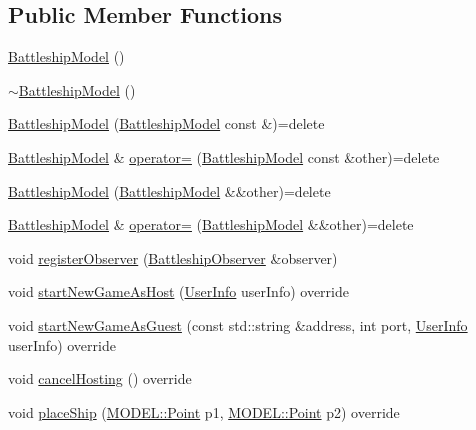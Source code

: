 \subsection*{Public Member Functions}
\begin{DoxyCompactItemize}
\item 
\hyperlink{classMODEL_1_1BattleshipModel_a8a7bef3348e68cf0267e79b445b94568}{Battleship\+Model} ()
\item 
\hyperlink{classMODEL_1_1BattleshipModel_aa5e22efe2dea484de9864a5a76b1c9f4}{$\sim$\+Battleship\+Model} ()
\item 
\hyperlink{classMODEL_1_1BattleshipModel_a7b959ebae2e8f6a5cf5a58aad6ee1676}{Battleship\+Model} (\hyperlink{classMODEL_1_1BattleshipModel}{Battleship\+Model} const \&)=delete
\item 
\hyperlink{classMODEL_1_1BattleshipModel}{Battleship\+Model} \& \hyperlink{classMODEL_1_1BattleshipModel_a6ba44e1437139bfe18033f0093e650db}{operator=} (\hyperlink{classMODEL_1_1BattleshipModel}{Battleship\+Model} const \&other)=delete
\item 
\hyperlink{classMODEL_1_1BattleshipModel_a6320be6c1f48b3f910929ac0e4b8fa1e}{Battleship\+Model} (\hyperlink{classMODEL_1_1BattleshipModel}{Battleship\+Model} \&\&other)=delete
\item 
\hyperlink{classMODEL_1_1BattleshipModel}{Battleship\+Model} \& \hyperlink{classMODEL_1_1BattleshipModel_a959c97c06c66558cf04ad4d91c5b5578}{operator=} (\hyperlink{classMODEL_1_1BattleshipModel}{Battleship\+Model} \&\&other)=delete
\item 
void \hyperlink{classMODEL_1_1BattleshipModel_a1afa557183362f561ae105fa141941ea}{register\+Observer} (\hyperlink{classBattleshipObserver}{Battleship\+Observer} \&observer)
\item 
void \hyperlink{classMODEL_1_1BattleshipModel_a655da28525f6ac4d2d15da6808c538b9}{start\+New\+Game\+As\+Host} (\hyperlink{classUserInfo}{User\+Info} user\+Info) override
\item 
void \hyperlink{classMODEL_1_1BattleshipModel_a076ef235e6ff9708c2bc0c2a4dcc141b}{start\+New\+Game\+As\+Guest} (const std\+::string \&address, int port, \hyperlink{classUserInfo}{User\+Info} user\+Info) override
\item 
void \hyperlink{classMODEL_1_1BattleshipModel_aa7cd87fbe771e195626f19960095bded}{cancel\+Hosting} () override
\item 
void \hyperlink{classMODEL_1_1BattleshipModel_a6de4c3b25683e4774fc9b524aa8c7e6a}{place\+Ship} (\hyperlink{classMODEL_1_1Point}{M\+O\+D\+E\+L\+::\+Point} p1, \hyperlink{classMODEL_1_1Point}{M\+O\+D\+E\+L\+::\+Point} p2) override
\end{DoxyCompactItemize}
